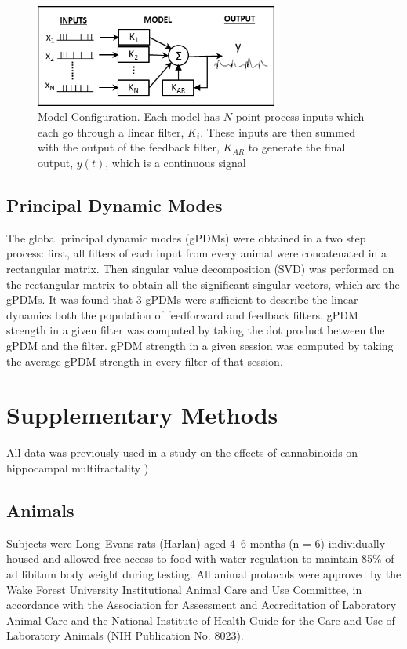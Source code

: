 \documentclass[11pt,a4paper,final]{article}
\begin{document}
\begin{figure}[!ht]
\centering
\includegraphics[width=80mm]{MVAR}
\caption[Model configuration schema]{
Model Configuration. Each model has $N$ point-process inputs which each go through a linear filter, $K_i$. These inputs are then summed with the output of the feedback filter, $K_{AR}$ to generate the final output, $y(t)$, which is a continuous signal}
\label{fMVAR}
\end{figure}

    \subsection{Principal Dynamic Modes \label{PDMs}}
The global principal dynamic modes (gPDMs) were obtained in a two step process: first, all filters of each input from every animal were concatenated in a rectangular matrix. Then  singular value decomposition (SVD) was performed on the rectangular matrix to obtain all the significant singular vectors, which are the gPDMs.
It was found that 3 gPDMs were sufficient to describe the linear dynamics both the population of feedforward and feedback filters.
gPDM strength in a given filter was computed by taking the dot product between the gPDM and the filter.
gPDM strength in a given session was computed by taking the average gPDM strength in every filter of that session.



\appendix
\renewcommand\thefigure{S\arabic{figure}} 
\setcounter{figure}{0} 

\section{Supplementary Methods \label{SM}}

All data was previously used in a study on the effects of cannabinoids on hippocampal multifractality \citep{dustin14,dustin15})

    \subsection{Animals}
Subjects were Long–Evans rats (Harlan) aged 4–6 months (n = 6) individually housed and allowed free access to food with water regulation to maintain 85\% of ad libitum body weight during testing.
All animal protocols were approved by the Wake Forest University Institutional Animal Care and Use Committee, in accordance with the Association for Assessment and Accreditation of Laboratory Animal Care and the National Institute of Health Guide for the Care and Use of Laboratory Animals (NIH Publication No. 8023).
\end{document}
